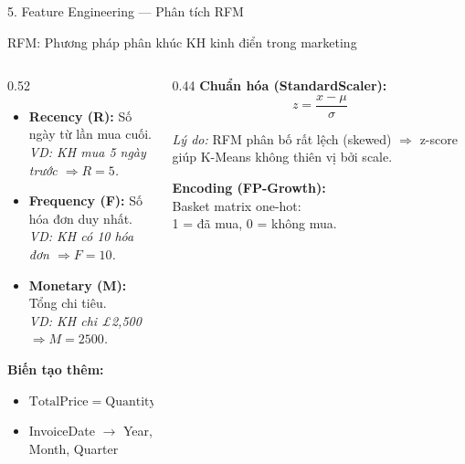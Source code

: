 \documentclass[10pt, aspectratio=169]{beamer}
\begin{document}
\begin{frame}{5. Feature Engineering --- Phân tích RFM}
    \small
    \begin{block}{RFM: Phương pháp phân khúc KH kinh điển trong marketing}
    \end{block}
    
    \vspace{0.1cm}
    \begin{columns}[T]
        \begin{column}{0.52\textwidth}
            \begin{itemize}
                \item \textbf{Recency (R):} Số ngày từ lần mua cuối.
                    \\\textit{VD: KH mua 5 ngày trước $\Rightarrow R=5$.}
                \item \textbf{Frequency (F):} Số hóa đơn duy nhất.
                    \\\textit{VD: KH có 10 hóa đơn $\Rightarrow F=10$.}
                \item \textbf{Monetary (M):} Tổng chi tiêu.
                    \\\textit{VD: KH chi £2,500 $\Rightarrow M=2500$.}
            \end{itemize}
            
            \vspace{0.15cm}
            \textbf{Biến tạo thêm:}
            \begin{itemize}
                \item $\text{TotalPrice} = \text{Quantity} \times \text{UnitPrice}$
                \item InvoiceDate $\to$ Year, Month, Quarter
            \end{itemize}
        \end{column}
        
        \begin{column}{0.44\textwidth}
            \textbf{Chuẩn hóa (StandardScaler):}
            $$z = \frac{x - \mu}{\sigma}$$
            
            \textit{Lý do:} RFM phân bố rất lệch (skewed) $\Rightarrow$ z-score giúp K-Means không thiên vị bởi scale.
            
            \vspace{0.15cm}
            \textbf{Encoding (FP-Growth):}\\
            Basket matrix one-hot:\\1 = đã mua, 0 = không mua.
        \end{column}
    \end{columns}
\end{frame}
\end{document}
